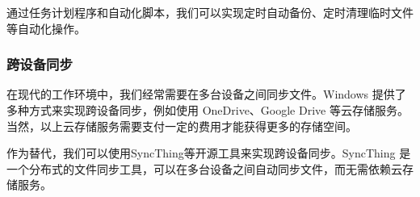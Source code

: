 \documentclass[../main.tex]{subfiles}
\begin{document}
通过任务计划程序和自动化脚本，我们可以实现定时自动备份、定时清理临时文件等自动化操作。

\subsubsection{跨设备同步}

在现代的工作环境中，我们经常需要在多台设备之间同步文件。Windows 提供了多种方式来实现跨设备同步，例如使用 OneDrive、Google Drive 等云存储服务。当然，以上云存储服务需要支付一定的费用才能获得更多的存储空间。

作为替代，我们可以使用SyncThing等开源工具来实现跨设备同步。SyncThing 是一个分布式的文件同步工具，可以在多台设备之间自动同步文件，而无需依赖云存储服务。
\end{document}
